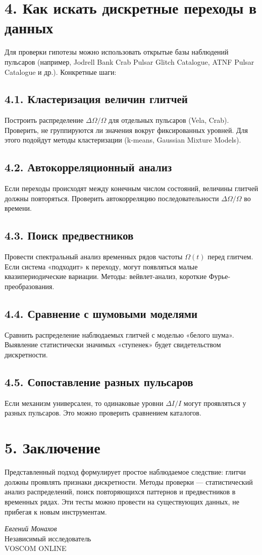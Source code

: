 \documentclass[a4paper,12pt]{article}
\begin{document}
\section*{4. Как искать дискретные переходы в данных}
Для проверки гипотезы можно использовать открытые базы наблюдений пульсаров (например, Jodrell Bank Crab Pulsar Glitch Catalogue, ATNF Pulsar Catalogue и др.). Конкретные шаги:

\subsection*{4.1. Кластеризация величин глитчей}
Построить распределение $\Delta \Omega / \Omega$ для отдельных пульсаров (Vela, Crab). Проверить, не группируются ли значения вокруг фиксированных уровней. Для этого подойдут методы кластеризации (k-means, Gaussian Mixture Models).

\subsection*{4.2. Автокорреляционный анализ}
Если переходы происходят между конечным числом состояний, величины глитчей должны повторяться. Проверить автокорреляцию последовательности $\Delta \Omega / \Omega$ во времени.

\subsection*{4.3. Поиск предвестников}
Провести спектральный анализ временных рядов частоты $\Omega(t)$ перед глитчем. Если система «подходит» к переходу, могут появляться малые квазипериодические вариации. Методы: вейвлет-анализ, короткие Фурье-преобразования.

\subsection*{4.4. Сравнение с шумовыми моделями}
Сравнить распределение наблюдаемых глитчей с моделью «белого шума». Выявление статистически значимых «ступенек» будет свидетельством дискретности.

\subsection*{4.5. Сопоставление разных пульсаров}
Если механизм универсален, то одинаковые уровни $\Delta I/I$ могут проявляться у разных пульсаров. Это можно проверить сравнением каталогов.

\section*{5. Заключение}
Представленный подход формулирует простое наблюдаемое следствие: глитчи должны проявлять признаки дискретности. Методы проверки --- статистический анализ распределений, поиск повторяющихся паттернов и предвестников в временных рядах. Эти тесты можно провести на существующих данных, не прибегая к новым инструментам.

\vspace{2em}
\noindent
\textit{Евгений Монахов} \\
Независимый исследователь \\
VOSCOM ONLINE
\end{document}
